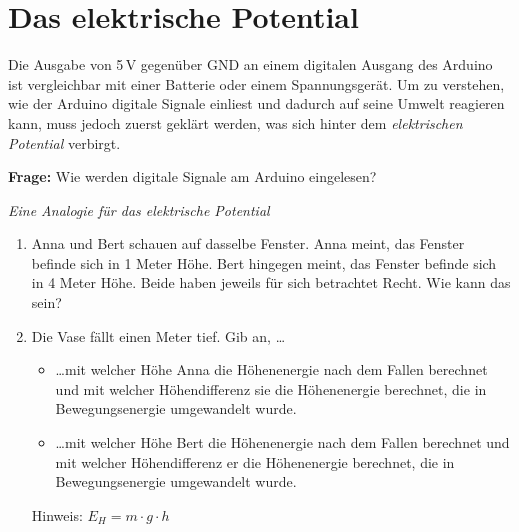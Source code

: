 \section{Das elektrische Potential}
\label{sec:elektrisches-potential}

Die Ausgabe von 5\,V gegenüber GND an einem digitalen Ausgang des Arduino ist vergleichbar mit einer Batterie oder einem Spannungsgerät. Um zu verstehen, wie der Arduino digitale Signale einliest und dadurch auf seine Umwelt reagieren kann, muss jedoch zuerst geklärt werden, was sich hinter dem \emph{elektrischen Potential} verbirgt.

\begin{ziel}
	\textbf{Frage:} Wie werden digitale Signale am Arduino eingelesen?
\end{ziel}

\begin{aufgabe} \emph{Eine Analogie für das elektrische Potential}
	
	\begin{enumerate}[label=\alph*), itemsep=0ex, parsep=0ex]
		\item Anna und Bert schauen auf dasselbe Fenster. %
		Anna meint, das Fenster befinde sich in 1 Meter Höhe. Bert hingegen meint, das Fenster befinde sich in 4 Meter Höhe. Beide haben jeweils für sich betrachtet Recht. Wie kann das sein?
		\item Die Vase fällt einen Meter tief. Gib an, \dots
		\begin{itemize}[itemsep=0ex]
			\item \dots mit welcher Höhe Anna die Höhenenergie nach dem Fallen berechnet und mit welcher Höhendifferenz sie die Höhenenergie berechnet, die in Bewegungsenergie umgewandelt wurde.
			\item \dots mit welcher Höhe Bert die Höhenenergie nach dem Fallen berechnet und mit welcher Höhendifferenz er die Höhenenergie berechnet, die in Bewegungsenergie umgewandelt wurde.
		\end{itemize}
		
		Hinweis: $E_H=m\cdot g\cdot h$
	\end{enumerate}
\end{aufgabe}


